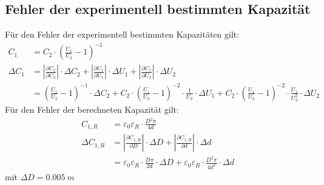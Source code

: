 \subsection{Fehler der experimentell bestimmten Kapazität}
Für den Fehler der experimentell bestimmten Kapazitäten gilt:
\begin{align}
    C_{1} &= C_{2}\cdot \left(\frac{U_{1}}{U_{2}}-1\right)^{-1} \nonumber \\
    \Delta C_{1} &= \left\vert\frac{\partial C_{1}}{\partial C_{2}}\right\vert\cdot \Delta C_{2} + \left\vert\frac{\partial C_{1}}{\partial U_{1}}\right\vert\cdot \Delta U_{1} + \left\vert\frac{\partial C_{1}}{\partial U_{2}}\right\vert\cdot \Delta U_{2} \nonumber \\
    &= \left(\frac{U_{1}}{U_{2}}-1\right)^{-1}\cdot \Delta C_{2} + C_{2}\cdot\left(\frac{U_{1}}{U_{2}}-1\right)^{-2}\cdot \frac{1}{U_{2}}\cdot\Delta U_{1} + C_{2}\cdot\left(\frac{U_{1}}{U_{2}}-1\right)^{-2}\cdot \frac{U_{1}}{U_{2}^{2}}\cdot\Delta U_{2}
\end{align}
Für den Fehler der berechneten Kapazität gilt:
\begin{align}
    C_{1,R} &= \varepsilon_{0} \varepsilon_{R} \cdot \frac{D^{2} \pi}{4 d} \nonumber \\
    \Delta C_{1,R} &= \left\vert\frac{\partial C_{1,R}}{\partial D}\right\vert\cdot \Delta D + \left\vert\frac{\partial C_{1,R}}{\partial d}\right\vert\cdot \Delta d \nonumber \\
    &= \varepsilon_{0}\varepsilon_{R}\cdot\frac{D \pi}{2 d}\cdot \Delta D + \varepsilon_{0} \varepsilon_{R}\cdot\frac{D^{2} \pi}{4 d^{2}}\cdot \Delta d
\end{align}
mit $ \Delta D= \SI{0,005}{m} $
%
%
%
